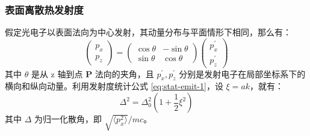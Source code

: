 \subsubsection{表面离散热发射度}
假定光电子以表面法向为中心发射，其动量分布与平面情形下相同，那么有：
\[
\left(\begin{array}{c}
p_x\\
p_z
\end{array}\right)=
\left(\begin{array}{cc}
\cos\theta & -\sin\theta\\
\sin\theta & \cos\theta 
\end{array}\right)
\left(\begin{array}{c}
p_x^{\prime}\\
p_z^{\prime}
\end{array}\right)
\]
其中 $\theta$ 是从 z 轴到点 \textbf{P} 法向的夹角，且 $p_x^{\prime}, p_z^{\prime}$ 分别是发射电子在局部坐标系下的横向和纵向动量。利用发射度统计公式 \ref{eq:stat-emit-1}，设 $\xi=ak$，就有：
\begin{equation}
\Delta^2 = \Delta_{0}^2\left(1+\frac{1}{2}\xi^2\right)
\end{equation}
其中 $\Delta$ 为归一化散角，即 $\sqrt{\langle p_x^2\rangle}/mc$。

